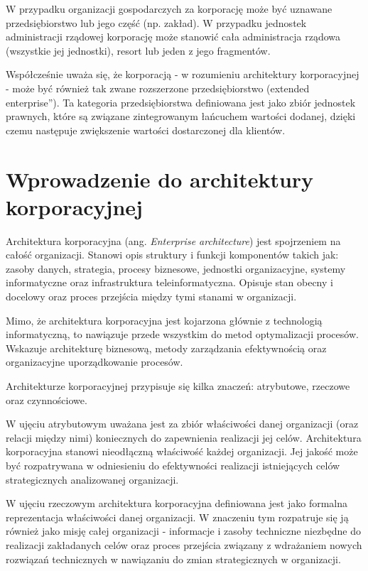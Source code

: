 W przypadku organizacji gospodarczych za korporację może być uznawane przedsiębiorstwo lub jego część (np. zakład). W przypadku jednostek administracji rządowej korporację może stanowić cała administracja rządowa (wszystkie jej jednostki), resort lub jeden z jego fragmentów.

Współcześnie uważa się, że korporacją - w rozumieniu architektury korporacyjnej - może być również tak zwane rozszerzone przedsiębiorstwo (\quotedblbase extended enterprise\textquotedblright). Ta kategoria przedsiębiorstwa definiowana jest jako zbiór jednostek prawnych, które są związane zintegrowanym łańcuchem wartości dodanej, dzięki czemu następuje zwiększenie wartości dostarczonej dla klientów. \cite{SobArchKorpDobrPr} 

\section{Wprowadzenie do architektury korporacyjnej}
Architektura korporacyjna (ang. \emph{Enterprise architecture}) jest spojrzeniem na całość organizacji. Stanowi opis struktury i funkcji komponentów takich jak: zasoby danych, strategia, procesy biznesowe, jednostki organizacyjne, systemy informatyczne oraz infrastruktura teleinformatyczna. Opisuje stan obecny i docelowy oraz proces przejścia między tymi stanami w organizacji. \cite{ArchKorpSob}

Mimo, że architektura korporacyjna jest kojarzona głównie z technologią informatyczną, to nawiązuje przede wszystkim do metod optymalizacji procesów. Wskazuje architekturę biznesową, metody zarządzania efektywnością oraz organizacyjne uporządkowanie procesów. \cite{ArchKorpSzymSup}

Architekturze korporacyjnej przypisuje się kilka znaczeń: atrybutowe, rzeczowe oraz czynnościowe.

W ujęciu atrybutowym uważana jest za zbiór właściwości danej organizacji (oraz relacji między nimi) koniecznych do zapewnienia realizacji jej celów. Architektura korporacyjna stanowi nieodłączną właściwość każdej organizacji. Jej jakość może być rozpatrywana w odniesieniu do efektywności realizacji istniejących celów strategicznych analizowanej organizacji. \cite{ArchKorpSob}

W ujęciu rzeczowym architektura korporacyjna definiowana jest jako formalna reprezentacja właściwości danej organizacji. W znaczeniu tym rozpatruje się ją również jako misję całej organizacji - informacje i zasoby techniczne niezbędne do realizacji zakładanych celów oraz proces przejścia związany z wdrażaniem nowych rozwiązań technicznych w nawiązaniu do zmian strategicznych w organizacji. \cite{ArchKorpSob}

